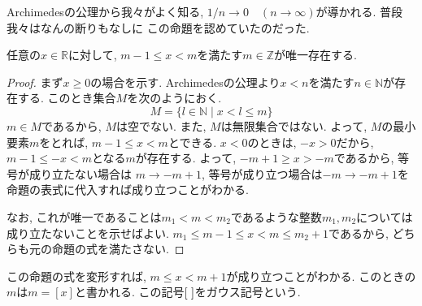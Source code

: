 \documentclass[a4j,dvipdfmx]{jsarticle}
\numberwithin{equation}{section}
\begin{document}
            Archimedesの公理から我々がよく知る, $1/n\rightarrow 0\quad (n\rightarrow\infty)$が導かれる. 普段我々はなんの断りもなしに
            この命題を認めていたのだった.

            \begin{screen}
                任意の$x\in\mathbb{R}$に対して, $m-1\leq x<m$を満たす$m\in\mathbb{Z}$が唯一存在する.
            \end{screen}
            \begin{proof}
                まず$x\geq 0$の場合を示す. Archimedesの公理より$x<n$を満たす$n\in\mathbb{N}$が存在する. このとき集合$M$を次のようにおく.
                \begin{equation*}
                    M=\{l\in\mathbb{N}\mid x<l\leq m\}
                \end{equation*}
                $m\in M$であるから, $M$は空でない. また, $M$は無限集合ではない. よって, $M$の最小要素$m$をとれば, $m-1\leq x<m$とできる.
                $x<0$のときは, $-x>0$だから, $m-1\leq-x<m$となる$m$が存在する. よって, $-m+1\geq x>-m$であるから, 等号が成り立たない場合は
                $m\rightarrow -m+1$, 等号が成り立つ場合は$-m\rightarrow -m+1$を命題の表式に代入すれば成り立つことがわかる. 

                なお, これが唯一であることは$m_1<m<m_2$であるような整数$m_1,m_2$については成り立たないことを示せばよい. 
                $m_1\leq m-1\leq x<m\leq m_2+1$であるから, どちらも元の命題の式を満たさない.
            \end{proof}
            この命題の式を変形すれば, $m\leq x<m+1$が成り立つことがわかる. このときの$m$は$m=[x]$と書かれる. この記号$[\hspace{1mm}]$をガウス記号という. 
\end{document}
